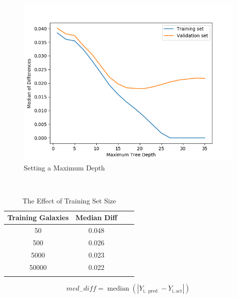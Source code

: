 \documentclass{beamer}
\begin{document}
\begin{frame}
    \begin{figure}
        \includegraphics[scale=0.4]{img/overfiting_tree.png}
        \caption*{Setting a Maximum Depth}
    \end{figure}
    \end{frame}
\begin{frame}
    \begin{table}[ht]\
        \caption*{The Effect of Training Set Size} %
        \centering %
        \begin{tabular}{c c c c} %
        \hline\hline %
        Training Galaxies & Median Diff \\ [0.5ex] %
        \hline %
        50 & 0.048  \\ %
        500 & 0.026  \\
        5000 & 0.023  \\
        50000 & 0.022  \\ [1ex] %
        \hline %
        \\
        \end{tabular}
        \label{table:nonlin} %
        \end{table}
        \begin{equation}
            m e d_{-} d i f f=\operatorname{median}\left(\left|Y_{\mathrm{i}, \text { pred }}-Y_{\mathrm{i}, \mathrm{act}}\right|\right)
            \end{equation}
    \end{frame}
\end{document}
